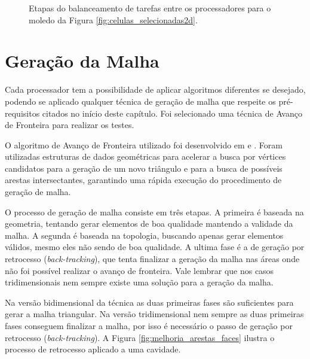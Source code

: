 \begin{figure}[!ht]
{	}
	\caption{Etapas do balanceamento de tarefas entre os processadores para o moledo da Figura \ref{fig:celulas_selecionadas2d}.}
	\label{fig:balanceamento_esfera}
\end{figure}


\section{Geração da Malha}
\label{sec:Geracao_da_Malha}

Cada processador tem a possibilidade de aplicar algoritmos diferentes se desejado, podendo se aplicado qualquer técnica de geração de malha que respeite os pré-requisitos citados no início deste capítulo. Foi selecionado uma técnica de Avanço de Fronteira para realizar os testes.

O algoritmo de Avanço de Fronteira utilizado foi desenvolvido em \cite{bib:Miranda99} e \cite{bib:Cavalcante-Neto01}. Foram utilizadas estruturas de dados geométricas para acelerar a busca por vértices candidatos para a geração de um novo triângulo e para a busca de possíveis arestas intersectantes, garantindo uma rápida execução do procedimento de geração de malha.

O processo de geração de malha consiste em três etapas. A primeira é baseada na geometria, tentando gerar elementos de boa qualidade mantendo a validade da malha. A segunda é baseada na topologia, buscando apenas gerar elementos válidos, mesmo eles não sendo de boa qualidade. A ultima fase é a de geração por retrocesso (\textit{back-tracking}), que tenta finalizar a geração da malha nas áreas onde não foi possível realizar o avanço de fronteira. Vale lembrar que nos casos tridimensionais nem sempre existe uma solução para a geração da malha.

Na versão bidimensional da técnica as duas primeiras fases são suficientes para gerar a malha triangular. Na versão tridimensional nem sempre as duas primeiras fases conseguem finalizar a malha, por isso é necessário o passo de geração por retrocesso (\textit{back-tracking}). A Figura \ref{fig:melhoria_arestas_faces} ilustra o processo de retrocesso aplicado a uma cavidade.


